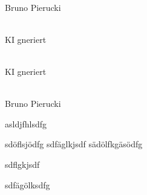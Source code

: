 \documentclass[10pt,a4paper,twocolumn,openany]{book}
\begin{document}
	

\frontmatter


\rpgMakeCover[
image = Bilder/cover,
title = "", %
subtitle =
]

\cleardoublepage

{
	\onecolumn
	
	\footnotesize
	\setlength{\parindent}{0pt}
	\setlength{\parskip}{\baselineskip}

	
	\vspace*{1cm}
	
	\begin{center}
	\fontsize{50}{50}	
	
	\vspace*{2cm}
	
	\\
	Bruno Pierucki
	
	\vspace*{1cm}
	
	\\
	KI gneriert
	
	\vspace*{1cm}
	
	\\
	KI gneriert
	
	\vspace*{1cm}
	
	\\
	Bruno Pierucki
	
	\vspace*{1cm}
	
	\vspace*{\fill}
	
		
	
	\end{center}
	
	\twocolumn
}

\tableofcontents

\mainmatter
\cleardoublepage

asldjfhlsdfg

sdöflsjödfg
sdfäglkjsdf
sädölfkgäsödfg

sdflgkjsdf

sdfägölksdfg



\rpgMakeMap[
image = Bilder/cover%
]
\end{document}
